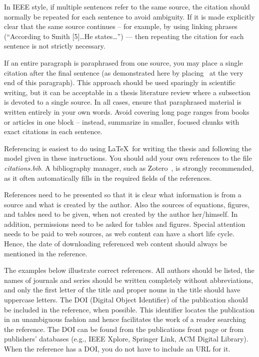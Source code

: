 In IEEE style, if multiple sentences refer to the same source, the
citation should normally be repeated for each sentence to avoid
ambiguity. If it is made explicitly clear that the same source
continues -- for example, by using linking phrases (“According to Smith
[5]\ldots He states\ldots”) — then repeating the citation for each
sentence is not strictly necessary.

If an entire paragraph is paraphrased from one source, you may place a
single citation after the final sentence (as demonstrated here by
placing~\cite{lappalainen} at the very end of this paragraph). This
approach should be used sparingly in scientific writing, but it can be
acceptable in a thesis literature review where a subsection is devoted
to a single source. In all cases, ensure that paraphrased material is
written entirely in your own words. Avoid covering long page ranges
from books or articles in one block -- instead, summarize in smaller,
focused chunks with exact citations in each
sentence.~\cite{lappalainen}

Referencing is easiest to do using \LaTeX\ for writing the thesis and
following the model given in these instructions. You should add your
own references to the file \textit{citations.bib}. A bibliography
manager, such as Zotero~\cite{zotero,uniouluzotero}, is strongly
recommended, as it often automatically fills in the required fields
of the references. 

References need to be presented so that it is clear what information
is from a source and what is created by the author. Also the sources
of equations, figures, and tables need to be given, when not created
by the author her/himself. In addition, permissions need to be asked
for tables and figures. Special attention needs to be paid to web
sources, as web content can have a short life cycle. Hence, the date
of downloading referenced web content should always be mentioned in
the reference.

The examples below illustrate correct references. All authors should
be listed, the names of journals and series should be written
completely without abbreviations, and only the first letter of the
title and proper nouns in the title should have uppercase letters. The
DOI (Digital Object Identifier) of the publication should be included
in the reference, when possible. This identifier locates the
publication in an unambiguous fashion and hence facilitates the work
of a reader searching the reference. The DOI can be found from the
publications front page or from publishers’ databases (e.g., IEEE
Xplore, Springer Link, ACM Digital Library). When the reference has a
DOI, you do not have to include an URL for it.


